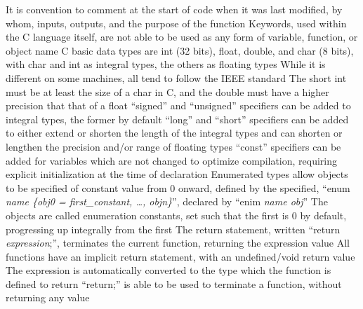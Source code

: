 \documentclass[11 pt, twoside]{article}
\newenvironment{outline*}
{
	\begin{outline}[enumerate]
	}
	{\end{outline}
}
\begin{document}
\begin{outline*}
\3 It is convention to comment at the start of code when it was last modified, by whom, inputs, outputs, and the purpose of the function
\2 Keywords, used within the C language itself, are not able to be used as any form of variable, function, or object name
\1 C basic data types are int (32 bits), float, double, and char (8 bits), with char and int as integral types, the others as floating types
\2 While it is different on some machines, all tend to follow the IEEE standard
\2 The short int must be at least the size of a char in C, and the double must have a higher precision that that of a float
\2 ``signed'' and ``unsigned'' specifiers can be added to integral types, the former by default
\2 ``long'' and ``short'' specifiers can be added to either extend or shorten the length of the integral types and can shorten or lengthen the precision and/or range of floating types
\2 ``const'' specifiers can be added for variables which are not changed to optimize compilation, requiring explicit initialization at the time of declaration
\1 Enumerated types allow objects to be specified of constant value from 0 onward, defined by the specified, ``enum \textit{name \{obj0 = first\_constant, \dots, objn\}}'', declared by ``enim \textit{name obj}''
\2 The objects are called enumeration constants, set such that the first is 0 by default, progressing up integrally from the first
\1 The return statement, written ``return \textit{expression};'', terminates the current function, returning the expression value
\2 All functions have an implicit return statement, with an undefined/void return value
\2 The expression is automatically converted to the type which the function is defined to return
\2 ``return;'' is able to be used to terminate a function, without returning any value
\end{outline*}
\end{document}
